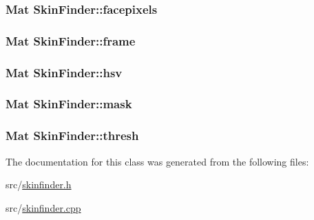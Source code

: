 \label{class_skin_finder_a55330ad48d6c72f9a0f9d16a874b39ce}
\hypertarget{class_skin_finder_a93fd2ba0d7494ec4aa2443352fe4f961}{
\subsubsection[{facepixels}]{\setlength{\rightskip}{0pt plus 5cm}Mat {\bf SkinFinder::facepixels}}}
\label{class_skin_finder_a93fd2ba0d7494ec4aa2443352fe4f961}
\hypertarget{class_skin_finder_ae7f9082d757d32f18c06b1f4ab600467}{
\subsubsection[{frame}]{\setlength{\rightskip}{0pt plus 5cm}Mat {\bf SkinFinder::frame}}}
\label{class_skin_finder_ae7f9082d757d32f18c06b1f4ab600467}
\hypertarget{class_skin_finder_a5e36bd9b188370eb528beeed691d6d2f}{
\subsubsection[{hsv}]{\setlength{\rightskip}{0pt plus 5cm}Mat {\bf SkinFinder::hsv}}}
\label{class_skin_finder_a5e36bd9b188370eb528beeed691d6d2f}
\hypertarget{class_skin_finder_a40173df66e4ec87e0c69c4858e49f7a7}{
\subsubsection[{mask}]{\setlength{\rightskip}{0pt plus 5cm}Mat {\bf SkinFinder::mask}}}
\label{class_skin_finder_a40173df66e4ec87e0c69c4858e49f7a7}
\hypertarget{class_skin_finder_a199a4f558e062704a4c24d65801e47ba}{
\subsubsection[{thresh}]{\setlength{\rightskip}{0pt plus 5cm}Mat {\bf SkinFinder::thresh}}}
\label{class_skin_finder_a199a4f558e062704a4c24d65801e47ba}


The documentation for this class was generated from the following files:\begin{DoxyCompactItemize}
\item 
src/\hyperlink{skinfinder_8h}{skinfinder.h}\item 
src/\hyperlink{skinfinder_8cpp}{skinfinder.cpp}\end{DoxyCompactItemize}
